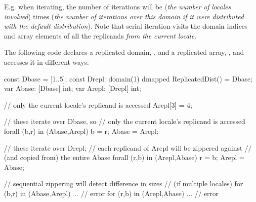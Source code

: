 E.g. when iterating, the number of iterations will be ({\it the number of
locales involved}) times ({\it the number of iterations over this domain if
it were distributed with the default distribution}). Note that serial iteration
visits the domain indices and array elements of all the replicands
\emph{from the current locale}.

%

\begin{example}
The following code declares a replicated domain, , and a
replicated array, , and accesses it in different ways:

\begin{chapel}
const Dbase = [1..5];
const Drepl: domain(1) dmapped ReplicatedDist() = Dbase;
var Abase: [Dbase] int;
var Arepl: [Drepl] int;

// only the current locale's replicand is accessed
Arepl[3] = 4;

// these iterate over Dbase, so
// only the current locale's replicand is accessed
forall (b,r) in (Abase,Arepl) b = r;
Abase = Arepl;

// these iterate over Drepl;
// each replicand of Arepl will be zippered against
// (and copied from) the entire Abase
forall (r,b) in (Arepl,Abase) r = b;
Arepl = Abase;

// sequential zippering will detect difference in sizes
// (if multiple locales)
for (b,r) in (Abase,Arepl) ... // error
for (r,b) in (Arepl,Abase) ... // error
\end{chapel}
\end{example}
